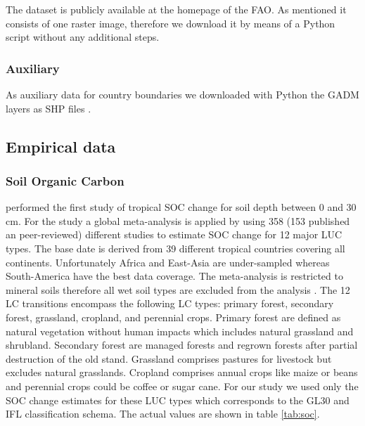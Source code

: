 			The dataset is publicly available at the homepage of the \ac{FAO}. As mentioned it consists of one raster image, therefore we download it by means of a Python script without any additional steps.

		\subsubsection{Auxiliary}
			As auxiliary data for country boundaries we downloaded with Python the \ac{GADM} layers as \ac{SHP} files \citep{Hijmans2018,Rossum2018}.

	\subsection{Empirical data}
		\subsubsection{Soil Organic Carbon}
			\citeauthor{Don2010} performed the first study of tropical \ac{SOC} change for soil depth between 0 and 30 cm. For the study a global meta-analysis is applied by using 358 (153 published an peer-reviewed) different studies to estimate \ac{SOC} change for 12 major \ac{LUC} types. The base date is derived from 39 different tropical countries covering all continents. Unfortunately Africa and East-Asia are under-sampled whereas South-America have the best data coverage. The meta-analysis is restricted to mineral soils therefore all wet soil types are excluded from the analysis \citeauthor{Don2010}. The 12 \ac{LC} transitions encompass the following \ac{LC} types: primary forest, secondary forest, grassland, cropland, and perennial crops. Primary forest are defined as natural vegetation without human impacts which includes natural grassland and shrubland. Secondary forest are managed forests and regrown forests after partial destruction of the old stand. Grassland comprises pastures for livestock but excludes natural grasslands. Cropland comprises annual crops like maize or beans and perennial crops could be coffee or sugar cane. For our study we used only the \ac{SOC} change estimates for these \ac{LUC} types which corresponds to the \ac{GL30} and \ac{IFL} classification schema. The actual values are shown in table \ref{tab:soc}.
